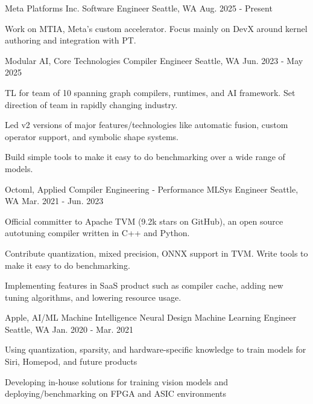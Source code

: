 \begin{cventries}
    \vspace{-0.6em}

  \cventry
    {Meta Platforms Inc.}
    {Software Engineer}
    {Seattle, WA}
    {Aug. 2025 - Present}
    {
      \begin{cvitems}
    \item {Work on MTIA, Meta's custom accelerator. Focus mainly on DevX around kernel authoring and integration with PT.}
	\vspace{-1em}
      \end{cvitems}
    }

  \cventry
    {Modular AI, Core Technologies}
    {Compiler Engineer}
    {Seattle, WA}
    {Jun. 2023 - May 2025}
    {
      \begin{cvitems}
    \item {TL for team of 10 spanning graph compilers, runtimes, and AI framework. Set direction of team in rapidly changing industry.}
    \item {Led v2 versions of major features/technologies like automatic fusion, custom operator support, and symbolic shape systems.}
    \item {Build simple tools to make it easy to do benchmarking over a wide range of models.}
	\vspace{-1em}
      \end{cvitems}
    }

  \vspace{-0.4em}
  \cventry
    {Octoml, Applied Compiler Engineering - Performance}
    {MLSys Engineer}
    {Seattle, WA}
    {Mar. 2021 - Jun. 2023}
    {
      \begin{cvitems}
    \item {Official committer to Apache TVM (9.2k stars on GitHub), an open source autotuning compiler written in C++ and Python.}
		\item {Contribute quantization, mixed precision, ONNX support in TVM. Write tools to make it easy to do benchmarking.}
		\item {Implementing features in SaaS product such as compiler cache, adding new tuning algorithms, and lowering resource usage.}
	\vspace{-1em}
      \end{cvitems}
    }


  \cventry
    {Apple, AI/ML Machine Intelligence Neural Design}
    {Machine Learning Engineer}
    {Seattle, WA}
    {Jan. 2020 - Mar. 2021}
    {
      \begin{cvitems}
        \item {Using quantization, sparsity, and hardware-specific knowledge to train models for Siri, Homepod, and future products}
        \item {Developing in-house solutions for training vision models and deploying/benchmarking on FPGA and ASIC environments}
	\vspace{-1em}
      \end{cvitems}
    }


\end{cventries}
